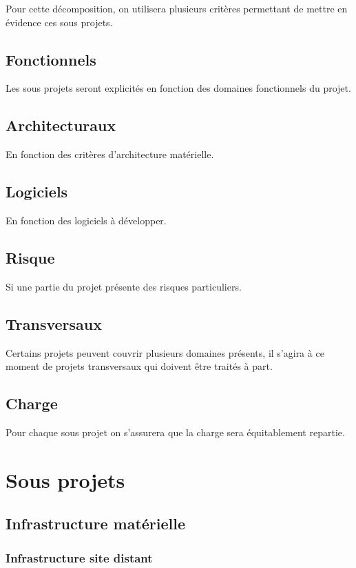 \documentclass[a4paper, 11pt, draft]{report}
\begin{document}
Pour cette décomposition, on utilisera plusieurs critères permettant de mettre en évidence ces sous projets. 

    \subsection{Fonctionnels} Les sous projets seront explicités en fonction des domaines fonctionnels du projet.
    \subsection{Architecturaux} En fonction des critères d'architecture matérielle.
    \subsection{Logiciels} En fonction des logiciels à développer.
    \subsection{Risque} Si une partie du projet présente des risques particuliers.

\subsection{Transversaux}

Certains projets peuvent couvrir plusieurs domaines présents, il s'agira à ce moment de projets transversaux qui doivent être traités à part.

\subsection{Charge}

Pour chaque sous projet on s'assurera que la charge sera équitablement repartie.

\section{Sous projets}

\subsection{Infrastructure matérielle}

\subsubsection{Infrastructure site distant}
\end{document}
